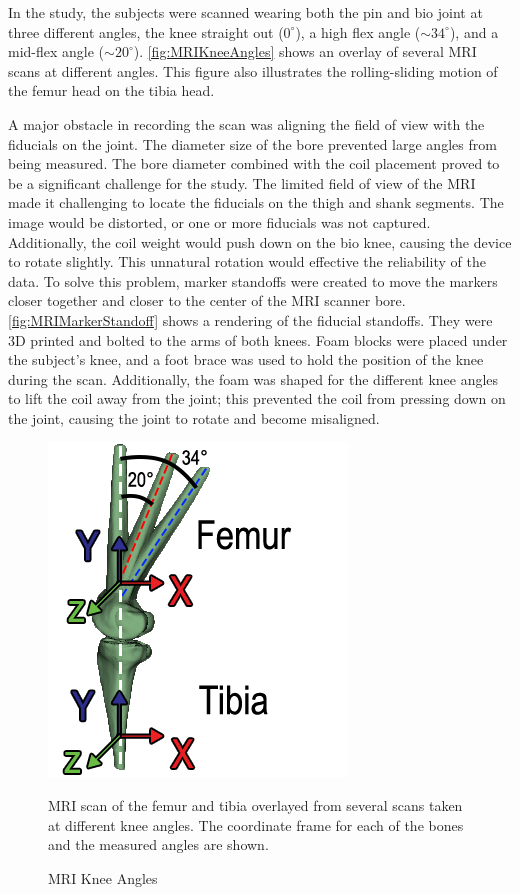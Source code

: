 In the study, the subjects were scanned wearing both the pin and bio joint at three different angles, the knee straight out ($0^{\circ}$), a high flex angle ($\sim34^{\circ}$),  and a mid-flex angle  ($\sim20^{\circ}$). \autoref{fig:MRIKneeAngles} shows an overlay of several MRI scans at different angles. This figure also illustrates the rolling-sliding motion of the femur head on the tibia head. 

A major obstacle in recording the scan was aligning the field of view with the fiducials on the joint. The diameter size of the bore prevented large angles from being measured. The bore diameter combined with the coil placement proved to be a significant challenge for the study. The limited field of view of the MRI made it challenging to locate the fiducials on the thigh and shank segments. The image would be distorted, or one or more fiducials was not captured. Additionally, the coil weight would push down on the bio knee, causing the device to rotate slightly. This unnatural rotation would effective the reliability of the data. To solve this problem, marker standoffs were created to move the markers closer together and closer to the center of the MRI scanner bore. \autoref{fig:MRIMarkerStandoff} shows a rendering of the fiducial standoffs. They were 3D printed and bolted to the arms of both knees. Foam blocks were placed under the subject's knee, and a foot brace was used to hold the position of the knee during the scan. Additionally, the foam was shaped for the different knee angles to lift the coil away from the joint; this prevented the coil from pressing down on the joint, causing the joint to rotate and become misaligned. 


\begin{figure}
    \centering
    \includegraphics{images/mech_design/mri_knee_angles.png}
    \caption{MRI Knee Angles}{MRI scan of the femur and tibia overlayed from several scans taken at different knee angles. The coordinate frame for each of the bones and the measured angles are shown.}
    \label{fig:MRIKneeAngles}
\end{figure}


